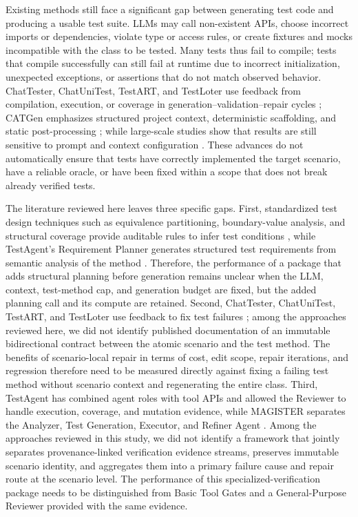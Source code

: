 \documentclass[pdflatex,sn-basic,Numbered,iicol]{sn-jnl}
\begin{document}
Existing methods still face a significant gap between generating test code and producing a usable test suite. LLMs may call non-existent APIs, choose incorrect imports or dependencies, violate type or access rules, or create fixtures and mocks incompatible with the class to be tested. Many tests thus fail to compile; tests that compile successfully can still fail at runtime due to incorrect initialization, unexpected exceptions, or assertions that do not match observed behavior. ChatTester, ChatUniTest, TestART, and TestLoter use feedback from compilation, execution, or coverage in generation--validation--repair cycles \cite{bib26,bib4,bib27,bib28}; CATGen emphasizes structured project context, deterministic scaffolding, and static post-processing \cite{bib29}; while large-scale studies show that results are still sensitive to prompt and context configuration \cite{bib5,bib11}. These advances do not automatically ensure that tests have correctly implemented the target scenario, have a reliable oracle, or have been fixed within a scope that does not break already verified tests.

The literature reviewed here leaves three specific gaps. First, standardized test design techniques such as equivalence partitioning, boundary-value analysis, and structural coverage provide auditable rules to infer test conditions \cite{bib30}, while TestAgent's Requirement Planner generates structured test requirements from semantic analysis of the method \cite{bib23}. Therefore, the performance of a package that adds structural planning before generation remains unclear when the LLM, context, test-method cap, and generation budget are fixed, but the added planning call and its compute are retained. Second, ChatTester, ChatUniTest, TestART, and TestLoter use feedback to fix test failures \cite{bib26,bib4,bib27,bib28}; among the approaches reviewed here, we did not identify published documentation of an immutable bidirectional contract between the atomic scenario and the test method. The benefits of scenario-local repair in terms of cost, edit scope, repair iterations, and regression therefore need to be measured directly against fixing a failing test method without scenario context and regenerating the entire class. Third, TestAgent has combined agent roles with tool APIs and allowed the Reviewer to handle execution, coverage, and mutation evidence, while MAGISTER separates the Analyzer, Test Generation, Executor, and Refiner Agent \cite{bib23,bib31}. Among the approaches reviewed in this study, we did not identify a framework that jointly separates provenance-linked verification evidence streams, preserves immutable scenario identity, and aggregates them into a primary failure cause and repair route at the scenario level. The performance of this specialized-verification package needs to be distinguished from Basic Tool Gates and a General-Purpose Reviewer provided with the same evidence.
\end{document}
